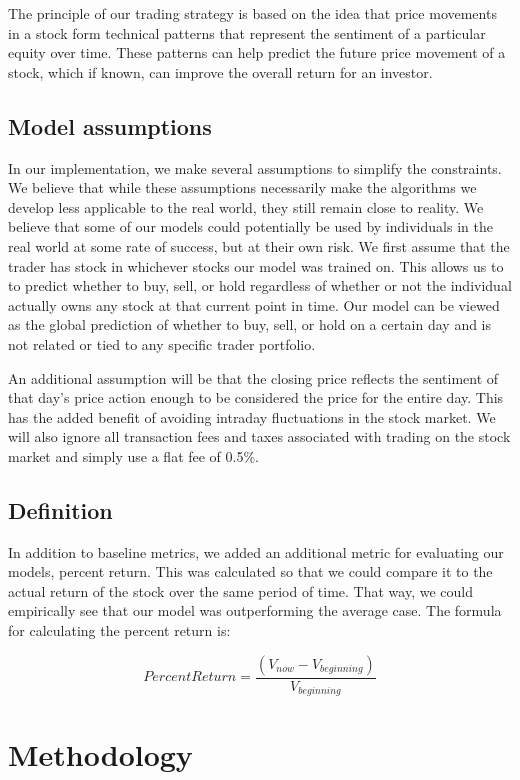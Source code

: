 \documentclass{article}
\begin{document}
The principle of our trading strategy is based on the idea that price movements in a stock form technical patterns that represent the sentiment of a particular equity over time. These patterns can help predict the future price movement of a stock, which if known, can improve the overall return for an investor.

\subsection{Model assumptions}
In our implementation, we make several assumptions to simplify the constraints. We believe that while these assumptions necessarily make the algorithms we develop less applicable to the real world, they still remain close to reality. We believe that some of our models could potentially be used by individuals in the real world at some rate of success, but at their own risk. We first assume that the trader has stock in whichever stocks our model was trained on. This allows us to to predict whether to buy, sell, or hold regardless of whether or not the individual actually owns any stock at that current point in time. Our model can be viewed as the global prediction of whether to buy, sell, or hold on a certain day and is not related or tied to any specific trader portfolio.

An additional assumption will be that the closing price reflects the sentiment of that day's price action enough to be considered the price for the entire day. This has the added benefit of avoiding intraday fluctuations in the stock market. We will also ignore all transaction fees and taxes associated with trading on the stock market and simply use a flat fee of 0.5\%. \cite{shaozheng}

\subsection{Definition}
In addition to baseline metrics, we added an additional metric for evaluating our models, percent return. This was calculated so that we could compare it to the actual return of the stock over the same period of time. That way, we could empirically see that our model was outperforming the average case. The formula for calculating the percent return is:

$$
Percent Return = \frac{(V_{now} - V_{beginning})}{V_{beginning}}
$$

\section{Methodology}
\end{document}
